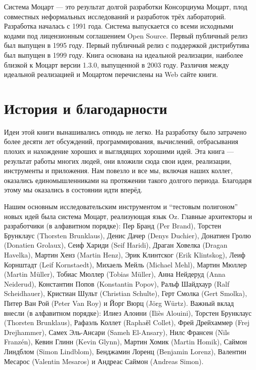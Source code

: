 Система Моцарт --- это результат долгой разработки Консорциума Моцарт, плод совместных неформальных исследований и разработок трёх лабораторий. Разработка началась с 1991 года. Система выпускается со всеми исходными кодами под лицензионным соглашением Open Source. Первый публичный релиз был выпущен в 1995 году. Первый публичный релиз с поддержкой дистрибутива был выпущен в 1999 году. Книга основана на идеальной реализации, наиболее близкой к Моцарт версии 1.3.0, выпущенной в 2003 году. Различия между идеальной реализацией и Моцартом перечислены на Web сайте книги.

\section*{История и благодарности}

Идеи этой книги вынашивались отнюдь не легко. На разработку было затрачено более десяти лет обсуждений, программирования, вычислений, отбрасывания плохих и нахождение хороших и выглядящих хорошими идей. Эта книга --- результат работы многих людей, они вложили сюда свои идеи, реализации, инструменты и приложения. Нам повезло и все мы, включая наших коллег, оказались единомышленниками на протяжении такого долгого периода. Благодаря этому мы оказались в состоянии идти вперёд.

Нашим основным исследовательским инструментом и ``тестовым полигоном'' новых идей была система Моцарт, реализующая язык Oz. Главные архитекторы и разработчики (в алфавитном порядке): Пер Бранд (Per Brand), Торстен Брунклаус (Thorsten Brunklaus), Денис Дачер (Denys Duchier), Донатиен Гролю (Donatien Grolaux), Сеиф Хариди (Seif Haridi), Драган Ховелка (Dragan Havelka), Мартин Хенз (Martin Henz), Эрик Клинтског (Erik Klintskog), Леиф Корнштадт (Leif Kornstaedt), Михаель Мейль (Michael Mehl), Мартин Мюллер (Martin Müller), Тобиас Мюллер (Tobias Müller), Анна Нейдеруд (Anna Neiderud), Константин Попов (Konstantin Popov), Ральф Шайдхаур (Ralf Scheidhauer), Кристиан Шульт (Christian Schulte), Герт Смолка (Gert Smolka), Питер Ван Рой (Peter Van Roy) и Йорг Вюрц (Jörg Würtz). Важный вклад внесли (в алфавитном порядке): Илиез Алоини (Iliès Alouini), Торстен Брунклаус (Thorsten Brunklaus), Рафаэль Коллет (Raphaёl Collet), Фрей Дрейхаммер (Frej Drejhammer), Самех Эль-Ансари (Sameh El-Ansary), Нилс Франсен (Nils Franz{\'e}n), Кевин Глинн (Kevin Glynn), Мартин Хомик (Martin Homik), Саймон Линдблом (Simon Lindblom), Бенджамин Лоренц ({Benjamin Lorenz}), Валентин Месарос (Valentin Mesaros) и Андреас Саймон (Andreas Simon).

